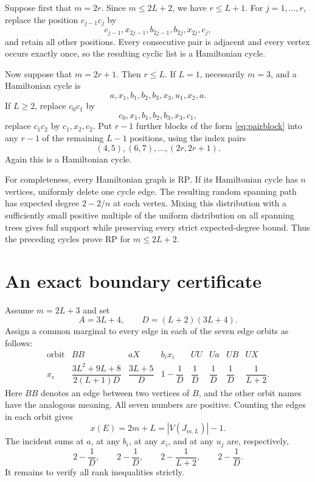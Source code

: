 \documentclass[11pt]{article}
\newcommand{\RP}{\mathrm{RP}}
\begin{document}
Suppose first that $m=2r$.  Since $m\leq2L+2$, we have $r\leq L+1$.
For $j=1,\ldots,r$, replace the position $c_{j-1}c_j$ by
\begin{equation}\label{eq:pairblock}
 c_{j-1},x_{2j-1},b_{2j-1},b_{2j},x_{2j},c_j,
\end{equation}
and retain all other positions.  Every consecutive pair is adjacent and
every vertex occurs exactly once, so the resulting cyclic list is a
Hamiltonian cycle.

Now suppose that $m=2r+1$.  Then $r\leq L$.  If $L=1$, necessarily $m=3$,
and a Hamiltonian cycle is
\[
 a,x_1,b_1,b_2,b_3,x_3,u_1,x_2,a.
\]
If $L\geq2$, replace $c_0c_1$ by
\[
 c_0,x_1,b_1,b_2,b_3,x_3,c_1,
\]
replace $c_1c_2$ by $c_1,x_2,c_2$.  Put $r-1$ further blocks of the form
\eqref{eq:pairblock} into any $r-1$ of the remaining $L-1$ positions,
using the index pairs
\[
 (4,5),(6,7),\ldots,(2r,2r+1).
\]
Again this is a Hamiltonian cycle.

For completeness, every Hamiltonian graph is \(\RP\).  If its Hamiltonian
cycle has $n$ vertices, uniformly delete one cycle edge.  The resulting
random spanning path has expected degree $2-2/n$ at each vertex.  Mixing
this distribution with a sufficiently small positive multiple of the
uniform distribution on all spanning trees gives full support while
preserving every strict expected-degree bound.  Thus the preceding cycles
prove \(\RP\) for $m\leq2L+2$.

\section{An exact boundary certificate}

Assume $m=2L+3$ and set
\[
 A=3L+4,\qquad D=(L+2)(3L+4).
\]
Assign a common marginal to every edge in each of the seven edge orbits as
follows:
\begin{equation}\label{eq:orbits}
\begin{array}{c|ccccccc}
\text{orbit}&BB&aX&b_ix_i&UU&Ua&UB&UX\\ \hline
x_e&\dfrac{3L^2+9L+8}{2(L+1)D}&
\dfrac{3L+5}{D}&1-\dfrac1D&
\dfrac1D&\dfrac1D&\dfrac1D&\dfrac1{L+2}.
\end{array}
\end{equation}
Here $BB$ denotes an edge between two vertices of $B$, and the other orbit
names have the analogous meaning.  All seven numbers are positive.  Counting
the edges in each orbit gives
\begin{equation}\label{eq:total}
 x(E)=2m+L=|V(J_{m,L})|-1.
\end{equation}
The incident sums at $a$, at any $b_i$, at any $x_i$, and at any $u_j$ are,
respectively,
\begin{equation}\label{eq:incidence}
 2-\frac1D,\qquad 2-\frac1D,\qquad
 2-\frac1{L+2},\qquad 2-\frac1D.
\end{equation}
It remains to verify all rank inequalities strictly.
\end{document}
